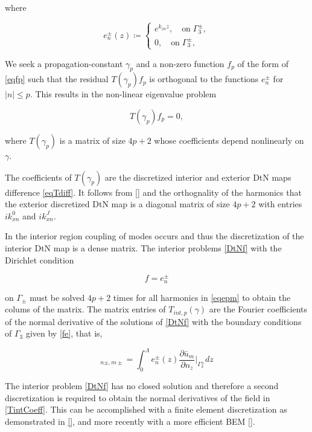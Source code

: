 where

\begin{equation}
e_n^\pm (z)\coloneqq \left \{ \begin{array} {ll}
e^{k_{zn} z}, \quad \textrm{on} \; \Gamma_3^{\pm}, \\
0, \quad \textrm{on} \; \Gamma_3^\pm,
\end{array} \right .
\label{eqepm}
\end{equation} 

We seek a propagation-constant $\gamma_p$ and a non-zero function $f_p$ of
the form of \ref{eqfp} such that the residual $T(\gamma_p) f_p$ is
orthogonal to the functions $e_n^\pm$ for $|n| \leq p$. This
results in the non-linear eigenvalue problem

\begin{equation}
T(\gamma_p) f_p = 0,
\label{eqTpfp}
\end{equation} 

where $T(\gamma_p)$ is a matrix of size $4p+2$ whose coefficients depend nonlinearly on $\gamma$.

The coefficients of $T(\gamma_p)$ are the discretized interior and
exterior DtN maps difference \ref{eqTdiff}. It follows from \ref{} and
the orthognality of the harmonics that the exterior discretized DtN
map is a diagonal matrix of size $4p+2$ with entries $ik_{xn}^0$ and
$ik_{xn}^J$.

In the interior region coupling of modes occurs and thus the
discretization of the interior DtN map is a dense matrix. The interior
problems \ref{DtNf} with the Dirichlet condition

\begin{equation}
  f = e_n^\pm
\label{fe}
\end{equation} 

on $\Gamma_\pm$ must be solved $4p+2$ times for all harmonics in
\ref{eqepm} to obtain the colums of the matrix. The matrix entries of
$T_{int,p}(\gamma)$ are the Fourier coefficients of the normal
derivative of the solutions of \ref{DtNf} with the boundary conditions of
$\Gamma_3$ given by \ref{fe}, that is,

\begin{equation}
[T_{int,p}(\gamma)]_{n \pm,m \pm} = \int_0^\Lambda e_n^\pm(z)
\frac{\partial \bar{u}_m}{\partial n_z} \bigg|_{\Gamma_3^\pm} dz
\label{TintCoeff}
\end{equation}

The interior problem \ref{DtNf} has no closed solution and therefore a
second discretization is required to obtain the normal derivatives of
the field in \ref{TintCoeff}. This can be accomplished with a finite
element discretization as demonstrated in \ref{}, and more recently
with a more efficient BEM \ref{}.

